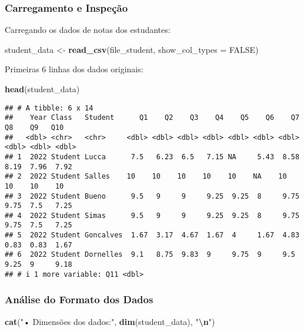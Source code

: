 \documentclass[
]{article}
\newenvironment{Shaded}{\begin{snugshade}}{\end{snugshade}}
\newcommand{\AttributeTok}[1]{\textcolor[rgb]{0.13,0.29,0.53}{#1}}
\newcommand{\ConstantTok}[1]{\textcolor[rgb]{0.56,0.35,0.01}{#1}}
\newcommand{\FunctionTok}[1]{\textcolor[rgb]{0.13,0.29,0.53}{\textbf{#1}}}
\newcommand{\NormalTok}[1]{#1}
\newcommand{\OtherTok}[1]{\textcolor[rgb]{0.56,0.35,0.01}{#1}}
\newcommand{\SpecialCharTok}[1]{\textcolor[rgb]{0.81,0.36,0.00}{\textbf{#1}}}
\newcommand{\StringTok}[1]{\textcolor[rgb]{0.31,0.60,0.02}{#1}}
\begin{document}
\subsubsection{Carregamento e
Inspeção}\label{carregamento-e-inspeuxe7uxe3o}

Carregando os dados de notas dos estudantes:

\begin{Shaded}
\begin{Highlighting}[]
\NormalTok{student\_data }\OtherTok{\textless{}{-}} \FunctionTok{read\_csv}\NormalTok{(file\_student, }\AttributeTok{show\_col\_types =} \ConstantTok{FALSE}\NormalTok{)}
\end{Highlighting}
\end{Shaded}

Primeiras 6 linhas dos dados originais:

\begin{Shaded}
\begin{Highlighting}[]
\FunctionTok{head}\NormalTok{(student\_data)}
\end{Highlighting}
\end{Shaded}

\begin{verbatim}
## # A tibble: 6 x 14
##    Year Class   Student      Q1    Q2    Q3    Q4    Q5    Q6    Q7    Q8    Q9   Q10
##   <dbl> <chr>   <chr>     <dbl> <dbl> <dbl> <dbl> <dbl> <dbl> <dbl> <dbl> <dbl> <dbl>
## 1  2022 Student Lucca      7.5   6.23  6.5   7.15 NA     5.43  8.58  8.19  7.96  7.92
## 2  2022 Student Salles    10    10    10    10    10    NA    10    10    10    10   
## 3  2022 Student Bueno      9.5   9     9     9.25  9.25  8     9.75  9.75  7.5   7.25
## 4  2022 Student Simas      9.5   9     9     9.25  9.25  8     9.75  9.75  7.5   7.25
## 5  2022 Student Goncalves  1.67  3.17  4.67  1.67  4     1.67  4.83  0.83  0.83  1.67
## 6  2022 Student Dornelles  9.1   8.75  9.83  9     9.75  9     9.5   9.25  9     9.18
## # i 1 more variable: Q11 <dbl>
\end{verbatim}

\subsubsection{Análise do Formato dos
Dados}\label{anuxe1lise-do-formato-dos-dados}

\begin{Shaded}
\begin{Highlighting}[]
\FunctionTok{cat}\NormalTok{(}\StringTok{"• Dimensões dos dados:"}\NormalTok{, }\FunctionTok{dim}\NormalTok{(student\_data), }\StringTok{"}\SpecialCharTok{\textbackslash{}n}\StringTok{"}\NormalTok{)}
\end{Highlighting}
\end{Shaded}
\end{document}
